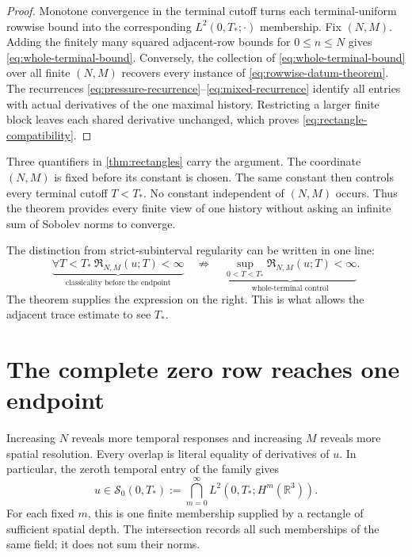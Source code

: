 \documentclass[11pt]{article}
\theoremstyle{definition}
\theoremstyle{remark}
\newcommand{\R}{\mathbb R}
\newcommand{\Szero}{\mathscr S_0}
\begin{document}
\begin{proof}
Monotone convergence in the terminal cutoff turns each terminal-uniform
rowwise bound into the corresponding \(L^2(0,T_*;\cdot)\) membership.
Fix \((N,M)\).  Adding the finitely many squared adjacent-row bounds for
\(0\leq n\leq N\) gives \eqref{eq:whole-terminal-bound}.  Conversely, the
collection of \eqref{eq:whole-terminal-bound} over all finite \((N,M)\)
recovers every instance of \eqref{eq:rowwise-datum-theorem}.  The recurrences
\eqref{eq:pressure-recurrence}--\eqref{eq:mixed-recurrence} identify all
entries with actual derivatives of the one maximal history.  Restricting a
larger finite block leaves each shared derivative unchanged, which proves
\eqref{eq:rectangle-compatibility}.
\end{proof}

Three quantifiers in \cref{thm:rectangles} carry the argument.  The coordinate
\((N,M)\) is fixed before its constant is chosen.  The same constant then
controls every terminal cutoff \(T<T_*\).  No constant independent of
\((N,M)\) occurs.  Thus the theorem provides every finite view of one history
without asking an infinite sum of Sobolev norms to converge.

The distinction from strict-subinterval regularity can be written in one
line:
\[
 \underbrace{\forall T<T_*\ \mathfrak R_{N,M}(u;T)<\infty}_{
 \text{classicality before the endpoint}}
 \quad\not\Rightarrow\quad
 \underbrace{\sup_{0<T<T_*}\mathfrak R_{N,M}(u;T)<\infty}_{
 \text{whole-terminal control}}.
\]
The theorem supplies the expression on the right.  This is what allows the
adjacent trace estimate to see \(T_*\).

\section{The complete zero row reaches one endpoint}
\label{sec:intersection}

Increasing \(N\) reveals more temporal responses and increasing \(M\) reveals
more spatial resolution.  Every overlap is literal equality of derivatives
of \(u\).  In particular, the zeroth temporal entry of the family gives
\begin{equation}
 u\in\Szero(0,T_*):=
 \bigcap_{m=0}^{\infty}L^2(0,T_*;H^m(\R^3)).
 \label{eq:complete-spatial-row}
\end{equation}
For each fixed \(m\), this is one finite membership supplied by a rectangle
of sufficient spatial depth.  The intersection records all such memberships
of the same field; it does not sum their norms.
\end{document}
